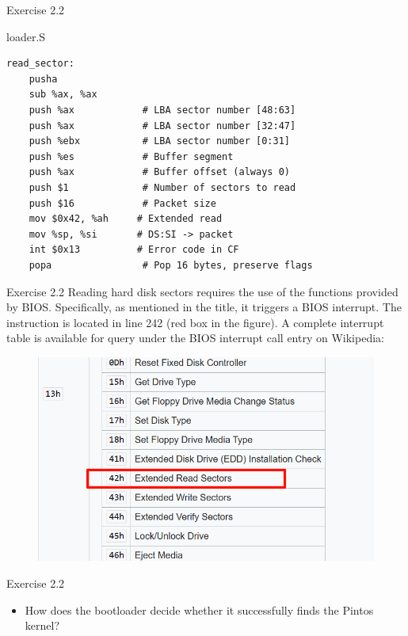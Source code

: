 \documentclass[14pt]{beamer}
\begin{document}
\begin{frame}[fragile]{Exercise 2.2}
    \begin{block}{loader.S}
        \begin{lstlisting}[language={[x86masm]Assembler}]
read_sector:
    pusha
    sub %ax, %ax
    push %ax            # LBA sector number [48:63]
    push %ax            # LBA sector number [32:47]
    push %ebx           # LBA sector number [0:31]
    push %es            # Buffer segment
    push %ax            # Buffer offset (always 0)
    push $1             # Number of sectors to read
    push $16            # Packet size
    mov $0x42, %ah     # Extended read
    mov %sp, %si       # DS:SI -> packet
    int $0x13          # Error code in CF
    popa                # Pop 16 bytes, preserve flags
        \end{lstlisting}
    \end{block}
\end{frame}
\begin{frame}[fragile]{Exercise 2.2}
Reading hard disk sectors requires the use of the functions provided by BIOS. Specifically, as mentioned in the title, it triggers a BIOS interrupt. The instruction is located in line 242 (red box in the figure). A complete interrupt table is available for query under the BIOS interrupt call entry on Wikipedia:
    \begin{figure}
        \centering
        \includegraphics[width=0.5\linewidth]{figure/13h.png}
        \end{figure}

\end{frame}
\begin{frame}[fragile]{Exercise 2.2}
\begin{itemize}
    \item How does the bootloader decide whether it successfully finds the Pintos kernel?
\end{itemize}
\end{frame}
\end{document}
